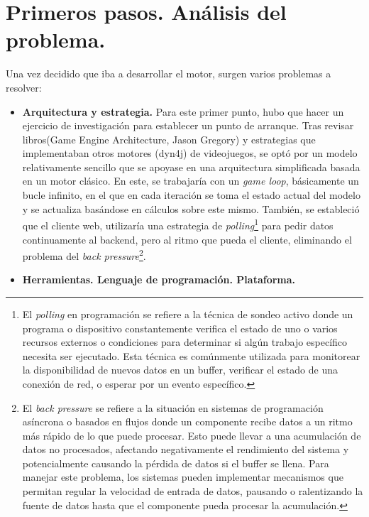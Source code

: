 \section{Primeros pasos. Análisis del problema.}
Una vez decidido que iba a desarrollar el motor, surgen varios problemas a resolver:
\begin{itemize}
    \item \textbf{Arquitectura y estrategia.}
    Para este primer punto, hubo que hacer un ejercicio de investigación para establecer un punto de arranque. Tras revisar libros(Game Engine Architecture, Jason Gregory\cite{GregoryGameEngine}) y estrategias que implementaban otros motores (dyn4j\cite{dyn4j}) de videojuegos, se optó por un modelo relativamente sencillo que se apoyase en una arquitectura simplificada basada en un motor clásico. En este, se trabajaría con un \textit{game loop}, básicamente un bucle infinito, en el que en cada iteración se toma el estado actual del modelo y se actualiza basándose en cálculos sobre este mismo. También, se estableció que el cliente web, utilizaría una estrategia de \textit{polling}\footnote{El \textit{polling} en programación se refiere a la técnica de sondeo activo donde un programa o dispositivo constantemente verifica el estado de uno o varios recursos externos o condiciones para determinar si algún trabajo específico necesita ser ejecutado. Esta técnica es comúnmente utilizada para monitorear la disponibilidad de nuevos datos en un buffer, verificar el estado de una conexión de red, o esperar por un evento específico.} para pedir datos continuamente al backend, pero al ritmo que pueda el cliente, eliminando el problema del \textit{back pressure}\footnote{El \textit{back pressure} se refiere a la situación en sistemas de programación asíncrona o basados en flujos donde un componente recibe datos a un ritmo más rápido de lo que puede procesar. Esto puede llevar a una acumulación de datos no procesados, afectando negativamente el rendimiento del sistema y potencialmente causando la pérdida de datos si el buffer se llena. Para manejar este problema, los sistemas pueden implementar mecanismos que permitan regular la velocidad de entrada de datos, pausando o ralentizando la fuente de datos hasta que el componente pueda procesar la acumulación.}.
    \item \textbf{Herramientas. Lenguaje de programación. Plataforma.}

\end{itemize}
